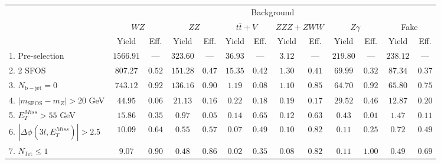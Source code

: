 \begin{tabular}{l||c|c||c|c||c|c||c|c||c|c||c|c}
\hline
 &       \multicolumn{12}{c||}{Background} \\
 & \multicolumn{2}{c||}{$WZ$} & \multicolumn{2}{c||}{$ZZ$} & \multicolumn{2}{c||}{$t\bar{t}+V$} & \multicolumn{2}{c||}{$ZZZ+ZWW$} & \multicolumn{2}{c||}{$Z\gamma$} & \multicolumn{2}{c}{Fake} \\ 
 & Yield & Eff. & Yield & Eff. & Yield & Eff. & Yield & Eff. & Yield & Eff. & Yield & Eff. \\
\hline\hline
1. Pre-selection &  $1566.91$ & --- &  $323.60$ & --- &  $36.93$ & --- &  $3.12$ & --- &  $219.80$ & --- &  $238.12$ & ---  \\ 
\hline
2. 2 SFOS &  $807.27$ &  $0.52$ &  $151.28$ &  $0.47$ &  $15.35$ &  $0.42$ &  $1.30$ &  $0.41$ &  $69.99$ &  $0.32$ &  $87.34$ &  $0.37$ \\ 
\hline
3. $N_{\mathrm{b-jet}}=0$ &  $743.12$ &  $0.92$ &  $136.16$ &  $0.90$ &  $1.19$ &  $0.08$ &  $1.10$ &  $0.85$ &  $64.70$ &  $0.92$ &  $65.80$ &  $0.75$ \\ 
\hline
4. $| m_{\mathrm{SFOS}} - m_Z | >  20$ GeV &  $44.95$ &  $0.06$ &  $21.13$ &  $0.16$ &  $0.22$ &  $0.18$ &  $0.19$ &  $0.17$ &  $29.52$ &  $0.46$ &  $12.87$ &  $0.20$ \\ 
\hline
5. $E_{T}^{Miss} > 55$ GeV &  $15.86$ &  $0.35$ &  $0.97$ &  $0.05$ &  $0.14$ &  $0.65$ &  $0.12$ &  $0.63$ &  $0.43$ &  $0.01$ &  $1.47$ &  $0.11$ \\ 
\hline
6. $|\Delta\phi(3l,E_{T}^{Miss})| > 2.5$ &  $10.09$ &  $0.64$ &  $0.55$ &  $0.57$ &  $0.07$ &  $0.49$ &  $0.10$ &  $0.82$ &  $0.11$ &  $0.25$ &  $0.72$ &  $0.49$ \\ 
\hline
7. $N_{\mathrm{Jet}} \leq 1$ &  $9.07$ &  $0.90$ &  $0.48$ &  $0.86$ &  $0.02$ &  $0.35$ &  $0.08$ &  $0.82$ &  $0.11$ &  $1.00$ &  $0.49$ &  $0.69$ \\ 
\hline
\end{tabular}

